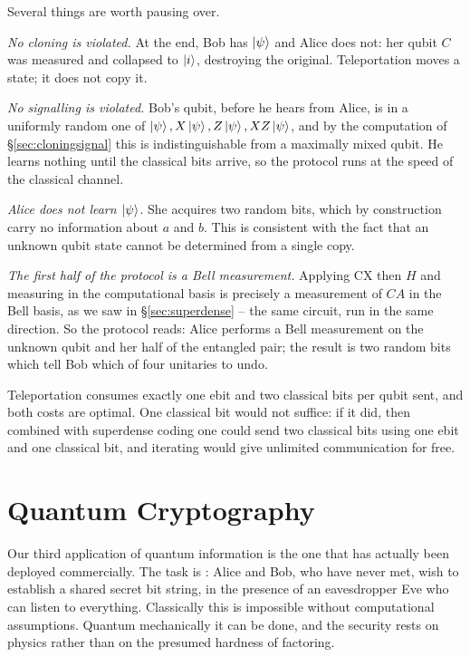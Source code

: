 \documentclass[a4paper]{scrartcl}
\newcommand{\CX}{\mathrm{CX}}
\begin{document}
Several things are worth pausing over.

\emph{No cloning is violated.} At the end, Bob has $\ket{\psi}$ and Alice does not: her qubit $C$ was measured and collapsed to $\ket{i}$, destroying the original. Teleportation moves a state; it does not copy it.

\emph{No signalling is violated.} Bob's qubit, before he hears from Alice, is in a uniformly random one of $\ket{\psi}, X\ket{\psi}, Z\ket{\psi}, XZ\ket{\psi}$, and by the computation of \S\ref{sec:cloningsignal} this is indistinguishable from a maximally mixed qubit. He learns nothing until the classical bits arrive, so the protocol runs at the speed of the classical channel.

\emph{Alice does not learn $\ket{\psi}$.} She acquires two random bits, which by construction carry no information about $a$ and $b$. This is consistent with the fact that an unknown qubit state cannot be determined from a single copy.

\emph{The first half of the protocol is a Bell measurement.} Applying $\CX$ then $H$ and measuring in the computational basis is precisely a measurement of $CA$ in the Bell basis, as we saw in \S\ref{sec:superdense} -- the same circuit, run in the same direction. So the protocol reads: Alice performs a Bell measurement on the unknown qubit and her half of the entangled pair; the result is two random bits which tell Bob which of four unitaries to undo.

\begin{remark}
	Teleportation consumes exactly one ebit and two classical bits per qubit sent, and both costs are optimal. One classical bit would not suffice: if it did, then combined with superdense coding one could send two classical bits using one ebit and one classical bit, and iterating would give unlimited communication for free.
\end{remark}

\section{Quantum Cryptography}\label{sec:crypto}

Our third application of quantum information is the one that has actually been deployed commercially. The task is : Alice and Bob, who have never met, wish to establish a shared secret bit string, in the presence of an eavesdropper Eve who can listen to everything. Classically this is impossible without computational assumptions. Quantum mechanically it can be done, and the security rests on physics rather than on the presumed hardness of factoring.
\end{document}
